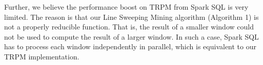 {Further, we believe the performance boost on TRPM from Spark SQL
is very limited. The reason is that our 
Line Sweeping Mining algorithm (Algorithm 1) is not a 
properly reducible function. That is, the result of a 
smaller window could not be used to compute the result of a larger
window. In such a case, Spark SQL has to process each
window independently in parallel, which is equivalent to our TRPM implementation.
%
%
%
}

